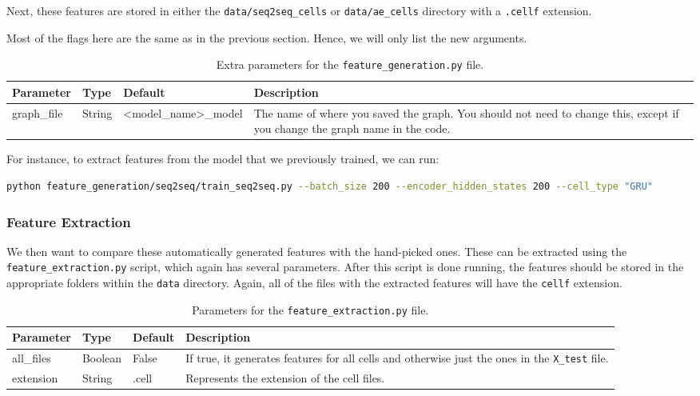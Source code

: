 Next, these features are stored in either the \texttt{data/seq2seq\_cells} or \texttt{data/ae\_cells} directory with a \texttt{.cellf} extension.

Most of the flags here are the same as in the previous section.
Hence, we will only list the new arguments.

\begin{table}[ht]
  \centering
  \begin{tabular}{ l | l | l | p{} }
    \textbf{Parameter} & \textbf{Type} & \textbf{Default} & \textbf{Description} \\ \hline \hline
    graph\_file & String & <model\_name>\_model & The name of where you saved the graph. You should not need to change this, except if you change the graph name in the code.
  \end{tabular}
  \caption{Extra parameters for the \texttt{feature\_generation.py} file.}
\end{table}

\noindent
For instance, to extract features from the model that we previously trained, we can run:
\begin{lstlisting}[language=Bash]
python feature_generation/seq2seq/train_seq2seq.py --batch_size 200 --encoder_hidden_states 200 --cell_type "GRU"
\end{lstlisting}

\subsubsection{Feature Extraction}

We then want to compare these automatically generated features with the hand-picked ones.
These can be extracted using the \texttt{feature\_extraction.py} script, which again has several parameters.
After this script is done running, the features should be stored in the appropriate folders within the \texttt{data} directory.
Again, all of the files with the extracted features will have the \texttt{cellf} extension.

\begin{table}[ht]
  \centering
  \begin{tabular}{ l | l | l | p{} }
    \textbf{Parameter} & \textbf{Type} & \textbf{Default} & \textbf{Description} \\ \hline \hline
    all\_files & Boolean & False & If true, it generates features for all cells and otherwise just the ones in the \texttt{X\_test} file. \\ \hline
    extension & String & .cell & Represents the extension of the cell files.
  \end{tabular}
  \caption{Parameters for the \texttt{feature\_extraction.py} file.}
\end{table}


